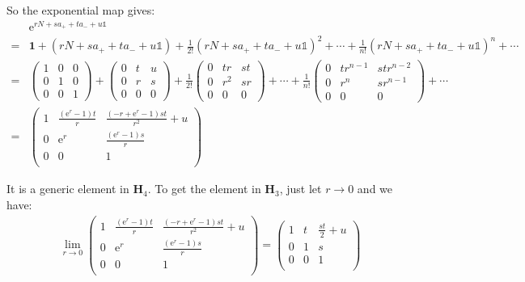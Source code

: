 \documentclass[]{ctexart}
\newcommand{\me}{\mathrm{e}}
\begin{document}
		So the exponential map gives:
			\begin{equation*}
			\begin{aligned}
				&\me^{rN+sa_++ta_-+u\mathds{1}}\\
				=&\mathbf{1}+(rN+sa_++ta_-+u\mathds{1})+\frac{1}{2!}(rN+sa_++ta_-+u\mathds{1})^2+\cdots+\frac{1}{n!}(rN+sa_++ta_-+u\mathds{1})^n+\cdots\\
				=&
				\begin{pmatrix}
				1 & 0 &  0 \\
				0 & 1 &  0\\
				0 & 0 & 1
				\end{pmatrix}
				+
				\begin{pmatrix}
				0 & t &  u \\
				0 & r &  s\\
				0 & 0 & 0
				\end{pmatrix}
				+\frac{1}{2!}
				\begin{pmatrix}
				0 & tr &  st \\
				0 & r^2 &  sr\\
				0 & 0 & 0
				\end{pmatrix}
				+\cdots+\frac{1}{n!}
				\begin{pmatrix}
				0 & tr^{n-1} &  str^{n-2} \\
				0 & r^n &  sr^{n-1}\\
				0 & 0 & 0
				\end{pmatrix}+\cdots\\
				=&
				\begin{pmatrix}
					1 & \frac{\left(\me^r-1\right) t}{r} & \frac{\left(-r+\me^r-1\right) s t}{r^2}+u \\
					0 & \me^r & \frac{\left(\me^r-1\right) s}{r} \\
					0 & 0 & 1 \\
				\end{pmatrix}
			\end{aligned}
			\end{equation*}
			
		It is a generic element in $\mathbf{H}_4$. To get the element in $\mathbf{H}_3$, just let $r\to 0$ and we have:
			\begin{equation*}
			\begin{aligned}
				\lim_{r\to 0}
				\begin{pmatrix}
				1 & \frac{\left(\me^r-1\right) t}{r} & \frac{\left(-r+\me^r-1\right) s t}{r^2}+u \\
				0 & \me^r & \frac{\left(\me^r-1\right) s}{r} \\
				0 & 0 & 1 \\
				\end{pmatrix}=
				\begin{pmatrix}
					1 & t & \frac{s t}{2}+u \\
					0 & 1 & s \\
					0 & 0 & 1 \\
				\end{pmatrix}
			\end{aligned}
			\end{equation*}
			
\end{document}
